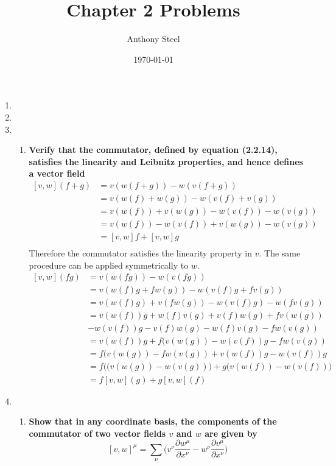 \documentclass[a4paper]{article}
\begin{document}
\title{Chapter 2 Problems}
\author{Anthony Steel}
\date{\today}
\maketitle
\begin{enumerate}
  \item
  \item
  \item
    \begin{enumerate}
    \item
    \textbf{Verify that the commutator, defined by equation (2.2.14),
    satisfies the linearity and Leibnitz properties, and hence defines a
    vector field}
  \[
    \begin{align}
    [v,w](f+g) &= v(w(f+g)) - w(v(f+g))\\
               &= v(w(f)+w(g))-w(v(f)+v(g))\\
               &= v(w(f))+v(w(g))-w(v(f))-w(v(g))\\
               &= v(w(f))-w(v(f))+v(w(g))-w(v(g))\\
               &= [v,w]f+[v,w]g\\
    \end{align}
  \]
  Therefore the commutator satisfies the linearity property in $v$. The same
  procedure can be applied symmetrically to $w$.
  \[
    \begin{align}
      [v,w](fg) &= v(w(fg)) - w(v(fg))\\
                &= v(w(f)g+fw(g)) - w(v(f)g+fv(g))\\
                &= v(w(f)g)+v(fw(g)) - w(v(f)g)-w(fv(g))\\
                &= v(w(f))g+w(f)v(g)+v(f)w(g)+fv(w(g))\\
                &-w(v(f))g-v(f)w(g)-w(f)v(g)-fw(v(g))\\
                &= v(w(f))g+f(v(w(g))-w(v(f))g-fw(v(g))\\
                &= f(v(w(g))-fw(v(g))+v(w(f))g-w(v(f))g\\
                &= f\Big((v(w(g))-w(v(g))\Big)+g\Big(v(w(f))-w(v(f))\Big)\\
                &= f[v,w](g)+g[v,w](f)
    \end{align}
  \]
  \end{enumerate}
  \item
  \begin{enumerate}
    \item \textbf{Show that in any coordinate basis, the components of the
      commutator of two vector fields $v$ and $w$ are given by}
      \[
        [v,w]^\mu = \sum_\nu \Big( v^\nu \frac{\partial w^\mu}{\partial x^\nu}
        - w^\nu\frac{\partial v^\mu}{\partial x^\nu} \Big)
      \]


\end{enumerate}
\end{enumerate}
\end{document}
